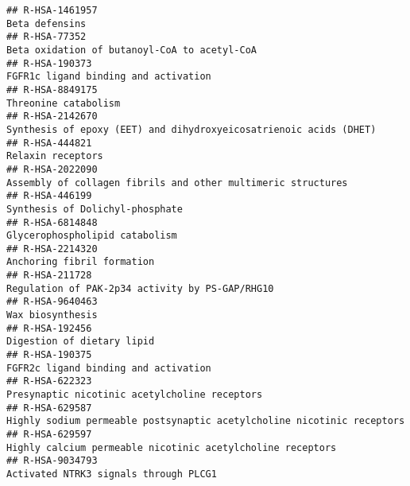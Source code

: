 \documentclass[
]{article}
\begin{document}
\begin{verbatim}
## R-HSA-1461957                                                                                                                       Beta defensins
## R-HSA-77352                                                                                           Beta oxidation of butanoyl-CoA to acetyl-CoA
## R-HSA-190373                                                                                                  FGFR1c ligand binding and activation
## R-HSA-8849175                                                                                                                 Threonine catabolism
## R-HSA-2142670                                                                    Synthesis of epoxy (EET) and dihydroxyeicosatrienoic acids (DHET)
## R-HSA-444821                                                                                                                     Relaxin receptors
## R-HSA-2022090                                                                         Assembly of collagen fibrils and other multimeric structures
## R-HSA-446199                                                                                                       Synthesis of Dolichyl-phosphate
## R-HSA-6814848                                                                                                       Glycerophospholipid catabolism
## R-HSA-2214320                                                                                                           Anchoring fibril formation
## R-HSA-211728                                                                                       Regulation of PAK-2p34 activity by PS-GAP/RHG10
## R-HSA-9640463                                                                                                                     Wax biosynthesis
## R-HSA-192456                                                                                                            Digestion of dietary lipid
## R-HSA-190375                                                                                                  FGFR2c ligand binding and activation
## R-HSA-622323                                                                                         Presynaptic nicotinic acetylcholine receptors
## R-HSA-629587                                                                Highly sodium permeable postsynaptic acetylcholine nicotinic receptors
## R-HSA-629597                                                                            Highly calcium permeable nicotinic acetylcholine receptors
## R-HSA-9034793                                                                                                Activated NTRK3 signals through PLCG1

\end{verbatim}
\end{document}

